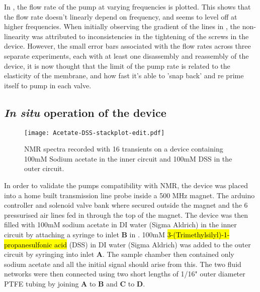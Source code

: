 In , the flow rate of the pump at varying frequencies is plotted. This
shows that the flow rate doesn't linearly depend on frequency, and seems to level off at higher
frequencies. When initially observing the gradient of the lines in , the non-
linearity was attributed to inconsistencies in the tightening of the screws in the device.
However, the small error bars associated with the flow rates across three separate
experiments, each with at least one disassembly and reassembly of the device, it is now thought that the limit of the
pump rate is related to the elasticity of the membrane, and how fast it's able to 'snap
back' and re prime itself to pump in each valve.

\newpage
\newpage

\subsection{\textit{In situ} operation of the device}

\begin{figure}[ht]
  \begin{center}
  \texttt{[image: Acetate-DSS-stackplot-edit.pdf]}
  \caption{NMR spectra recorded with 16 transients on a device containing 100mM Sodium
  acetate in the inner circuit and 100mM DSS in the outer circuit.}
  \label{fig:spectra}
  \end{center}
\end{figure}

In order to validate the pumps compatibility with NMR, the device was placed into a home
built transmission line probe inside a 500 MHz magnet. The arduino controller and solenoid valve
bank where secured outside the magnet and the 6 pressurised air lines fed in through the top of
the magnet. The device was then filled with 100mM sodium acetate in DI water (Sigma Aldrich) in
the inner circuit by attaching a syringe to inlet \textbf{B} in . 100mM \hl{3-(Trimethylsilyl)-1-propanesulfonic
acid} (DSS) in DI
water (Sigma Aldrich) was added to the outer circuit by syringing into inlet \textbf{A}. The sample
chamber then contained only sodium acetate and all the initial signal should arise from this. The two fluid networks
were then connected using two short lengths of 1/16" outer diameter PTFE tubing by joining
\textbf{A} to \textbf{B} and \textbf{C} to \textbf{D}.

